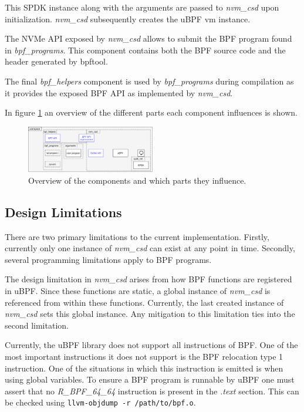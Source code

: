 \documentclass[conference]{IEEEtran}
\newcommand\bashstyle{
	\lstset{
		language=Bash,
		basicstyle=\ttm,
		showstringspaces=false,
		tabsize=2,
		aboveskip=0.2cm,
		belowskip=0.2cm,
		prebreak=\textbackslash,
		extendedchars=true,
		mathescape=false,
		linewidth=8.85cm,
		breaklines=true
	}
}
\newcommand\bashinline[1]{{\bashstyle\lstinline!#1!}}
\begin{document}
This SPDK instance along with the arguments are passed to \textit{nvm\_csd}
upon initialization. \textit{nvm\_csd} subsequently creates the uBPF vm
instance.

The NVMe API exposed by \textit{nvm\_csd} allows to submit the BPF program found
in \textit{bpf\_programs}. This component contains both the BPF source code and
the header generated by bpftool.

The final \textit{bpf\_helpers} component is used by \textit{bpf\_programs}
during compilation as it provides the exposed BPF API as implemented by
\textit{nvm\_csd}.

In figure \ref{fig:prototypecomponents} an overview of the different parts each
component influences is shown.

\begin{center}
	\begin{figure}[H]
		\includegraphics[width=0.5\textwidth]{resources/images/prototype-components.png}
		\captionsetup{justification=centering}
		\caption{Overview of the components and which parts they influence.}
		\label{fig:prototypecomponents}
	\end{figure}
\end{center}

\subsection{Design Limitations}

There are two primary limitations to the current implementation. Firstly,
currently only one instance of \textit{nvm\_csd} can exist at any point in time.
Secondly, several programming limitations apply to BPF programs.

The design limitation in \textit{nvm\_csd} arises from how BPF functions are
registered in uBPF. Since these functions are static, a global instance of
\textit{nvm\_csd} is referenced from within these functions. Currently, the last
created instance of \textit{nvm\_csd} sets this global instance. Any mitigation
to this limitation ties into the second limitation.

Currently, the uBPF library does not support all instructions of BPF. One of the
most important instructions it does not support is the BPF relocation type 1
instruction. One of the situations in which this instruction is emitted is when
using global variables. To ensure a BPF program is runnable by uBPF one
must assert that no \textit{R\_BPF\_64\_64} instruction is present in the
\textit{.text} section. This can be checked
using\bashinline{llvm-objdump -r /path/to/bpf.o}.
\end{document}

